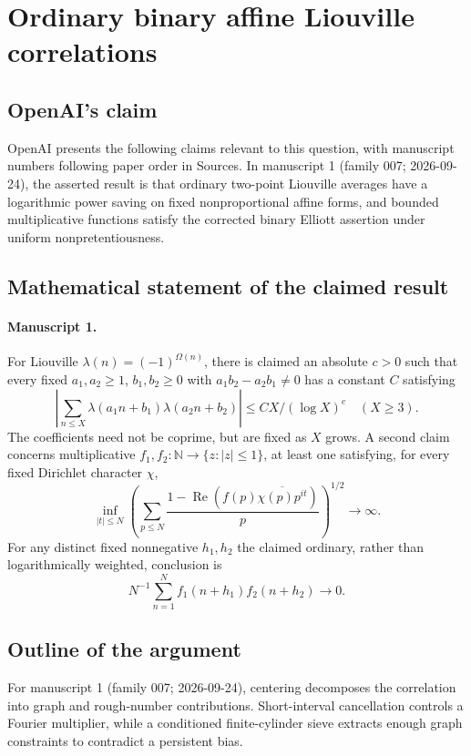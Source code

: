 \documentclass[11pt]{article}
\begin{document}
\section*{Ordinary binary affine Liouville correlations}

\subsection{OpenAI's claim}
OpenAI presents the following claims relevant to this question, with manuscript numbers following paper order in Sources. In manuscript 1 (family 007; 2026-09-24), the asserted result is that ordinary two-point Liouville averages have a logarithmic power saving on fixed nonproportional affine forms, and bounded multiplicative functions satisfy the corrected binary Elliott assertion under uniform nonpretentiousness.

\subsection{Mathematical statement of the claimed result}
\paragraph{Manuscript 1.}
For Liouville $\lambda(n)=(-1)^{\Omega(n)}$, there is claimed an absolute $c>0$ such that every fixed $a_1,a_2\ge1$, $b_1,b_2\ge0$ with $a_1b_2-a_2b_1\ne0$ has a constant $C$ satisfying
\[
 |\sum_{n\le X}\lambda(a_1n+b_1)\lambda(a_2n+b_2)|\le C X/(\log X)^c\quad(X\ge3).
\]
The coefficients need not be coprime, but are fixed as $X$ grows. A second claim concerns multiplicative $f_1,f_2:\mathbb N\to\{z:|z|\le1\}$, at least one satisfying, for every fixed Dirichlet character $\chi$,
\[
 \inf_{|t|\le N}\left(\sum_{p\le N}\frac{1-\operatorname{Re}(f(p)\overline{\chi(p)p^{it}})}p\right)^{1/2}\longrightarrow\infty.
\]
For any distinct fixed nonnegative $h_1,h_2$ the claimed ordinary, rather than logarithmically weighted, conclusion is
\[
 N^{-1}\sum_{n=1}^Nf_1(n+h_1)f_2(n+h_2)\longrightarrow0.
\]

\subsection{Outline of the argument}
For manuscript 1 (family 007; 2026-09-24), centering decomposes the correlation into graph and rough-number contributions. Short-interval cancellation controls a Fourier multiplier, while a conditioned finite-cylinder sieve extracts enough graph constraints to contradict a persistent bias.
\end{document}
